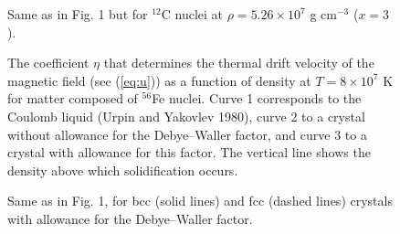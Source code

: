 \begin{figure}[t]
\hsize
\centerline{{}}
\caption{\label{figure2}
Same as in Fig. 1 but for $^{12}$C nuclei at
$\rho= 5.26 \times 10^7$ g cm$^{-3}$ ($x=3$).
}
\end{figure}


\newpage



\begin{figure}[t]
\hsize
\centerline{{}}
\caption{\label{figure3}
The coefficient $\eta$ that determines the thermal
drift velocity of the magnetic field (see (\ref{eq:u})) as 
a function of density at $T=8 \times 10^7$ K for matter composed 
of $^{56}$Fe nuclei. Curve 1 corresponds to
the Coulomb liquid (Urpin and Yakovlev 1980), curve 2 to
a crystal without allowance for the Debye--Waller factor, and curve
3 to a crystal with allowance for this factor. The vertical line
shows the density above which solidification occurs.
}
\end{figure}

\newpage



\begin{figure}[t]
\hsize
\centerline{{}}
\caption{\label{figure4}
Same as in Fig. 1, for bcc (solid lines) and fcc (dashed
lines) crystals with allowance for the Debye--Waller factor.
}
\end{figure}



